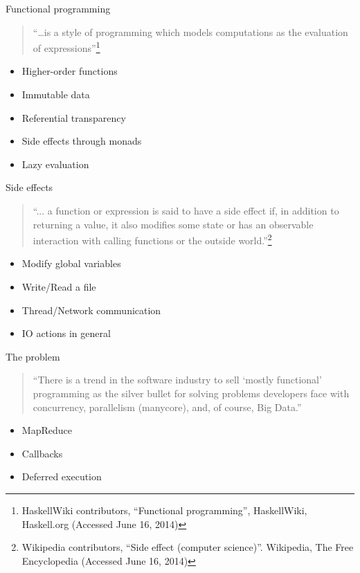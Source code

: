 \documentclass[rail]{beamer}
\begin{document}
\begin{frame}{Functional programming}
  \begin{quote}
    ``\dots is a style of programming which models computations as the
    evaluation of expressions''\footnote[frame,1]
    {HaskellWiki contributors, ``Functional programming'',
      HaskellWiki, Haskell.org (Accessed June 16, 2014)}
  \end{quote}
  \begin{itemize}[<+->]
  \item Higher-order functions
  \item Immutable data
  \item Referential transparency
  \item Side effects through monads
  \item Lazy evaluation
  \end{itemize}
\end{frame}

\begin{frame}{Side effects}
  \begin{quote}
    ``... a function or expression is said to have a side effect if, in
    addition to returning a value, it also modifies some state or has
    an observable interaction with calling functions or the outside
    world.''\footnote[frame,1]
    {Wikipedia contributors, ``Side effect (computer science)''.
      Wikipedia, The Free Encyclopedia (Accessed June 16, 2014)}
  \end{quote}
  \pause
  \begin{itemize}[<+->]
  \item Modify global variables
  \item Write/Read a file
  \item Thread/Network communication
  \item IO actions in general
  \end{itemize}

\end{frame}

\begin{frame}{The problem}
  \begin{quote}
    ``There is a trend in the software industry to sell `mostly
    functional' programming as the silver bullet for solving problems
    developers face with concurrency, parallelism (manycore), and, of
    course, Big Data.''
  \end{quote}
  \pause
  \begin{itemize}[<+->]
  \item MapReduce
  \item Callbacks
  \item Deferred execution
  \end{itemize}
\end{frame}
\end{document}
